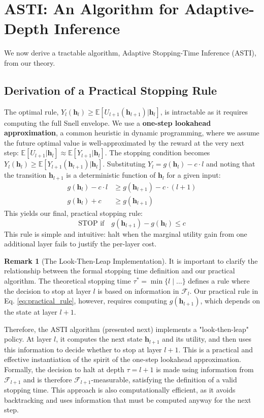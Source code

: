 \documentclass[12pt]{imsart}
\newcommand{\E}{\mathbb{E}}
\newcommand{\F}{\mathcal{F}}
\newcommand{\h}{\mathbf{h}}
\theoremstyle{plain}
\theoremstyle{definition}
\newtheorem{remark}[theorem]{Remark}
\begin{document}
\section{ASTI: An Algorithm for Adaptive-Depth Inference}
\label{sec:algorithm}

We now derive a tractable algorithm, Adaptive Stopping-Time Inference (ASTI), from our theory.

\subsection{Derivation of a Practical Stopping Rule}
The optimal rule, $Y_l(\h_l) \ge \E[U_{l+1}(\h_{l+1}) | \h_l]$, is intractable as it requires computing the full Snell envelope. We use a \textbf{one-step lookahead approximation}, a common heuristic in dynamic programming, where we assume the future optimal value is well-approximated by the reward at the very next step: $\E[U_{l+1} | \h_l] \approx \E[Y_{l+1} | \h_l]$. The stopping condition becomes $Y_l(\h_l) \ge \E[Y_{l+1}(\h_{l+1}) | \h_l]$.
Substituting $Y_l = g(\h_l) - c \cdot l$ and noting that the transition $\h_{l+1}$ is a deterministic function of $\h_l$ for a given input:
\begin{align*}
g(\h_l) - c \cdot l &\ge g(\h_{l+1}) - c \cdot (l+1) \\
g(\h_l) + c &\ge g(\h_{l+1})
\end{align*}
This yields our final, practical stopping rule:
\begin{equation} \label{eq:practical_rule}
\boxed{
\text{STOP if} \quad g(\h_{l+1}) - g(\h_l) \le c
}
\end{equation}
This rule is simple and intuitive: halt when the marginal utility gain from one additional layer fails to justify the per-layer cost.

\begin{remark}[The Look-Then-Leap Implementation]
\label{rem:look_then_leap}
It is important to clarify the relationship between the formal stopping time definition and our practical algorithm. The theoretical stopping time $\tau^* = \min\{l \mid \dots\}$ defines a rule where the decision to stop at layer $l$ is based on information in $\F_l$. Our practical rule in Eq. \eqref{eq:practical_rule}, however, requires computing $g(\h_{l+1})$, which depends on the state at layer $l+1$.

Therefore, the ASTI algorithm (presented next) implements a "look-then-leap" policy. At layer $l$, it computes the next state $\h_{l+1}$ and its utility, and then uses this information to decide whether to stop at layer $l+1$. This is a practical and effective instantiation of the spirit of the one-step lookahead approximation. Formally, the decision to halt at depth $\tau=l+1$ is made using information from $\F_{l+1}$ and is therefore $\F_{l+1}$-measurable, satisfying the definition of a valid stopping time. This approach is also computationally efficient, as it avoids backtracking and uses information that must be computed anyway for the next step.
\end{remark}
\end{document}
